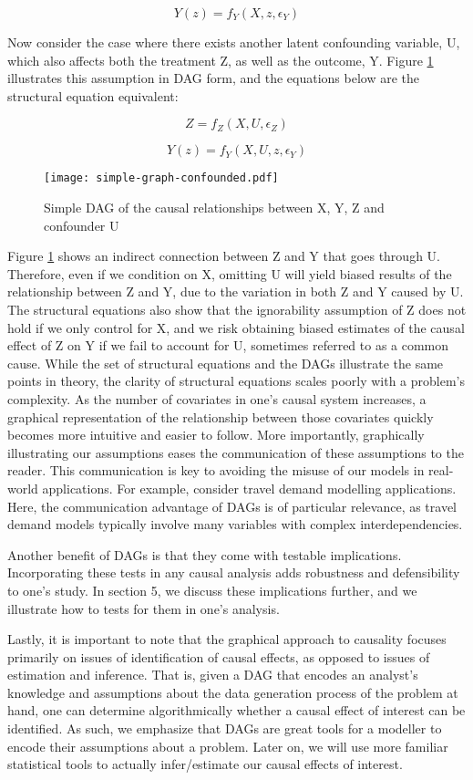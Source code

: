 \[Y(z) = f_Y(X, z, \epsilon_Y)  \]

Now consider the case where there exists another latent confounding variable, U, which also affects both the treatment Z, as well as the outcome, Y.
Figure \ref{fig:simple-graph-confounded} illustrates this assumption in DAG form, and the equations below are the structural equation equivalent:

\[Z = f_Z(X, U, \epsilon_Z)  \]

\[Y(z) = f_Y(X, U, z, \epsilon_Y)  \]

\begin{figure}[h!]
   \centering
   \texttt{[image: simple-graph-confounded.pdf]}
   \caption{Simple DAG of the causal relationships between X, Y, Z and confounder U}
   \label{fig:simple-graph-confounded}
\end{figure}

Figure \ref{fig:simple-graph-confounded} shows an indirect connection between Z and Y that goes through U.
Therefore, even if we condition on X, omitting U will yield biased results of the relationship between Z and Y, due to the variation in both Z and Y caused by U.
The structural equations also show that the ignorability assumption of Z does not hold if we only control for X, and we risk obtaining biased estimates of the causal effect of Z on Y if we fail to account for U, sometimes referred to as a common cause.
While the set of structural equations and the DAGs illustrate the same points in theory, the clarity of structural equations scales poorly with a problem's complexity.
As the number of covariates in one's causal system increases, a graphical representation of the relationship between those covariates quickly becomes more intuitive and easier to follow.
More importantly, graphically illustrating our assumptions eases the communication of these assumptions to the reader.
This communication is key to avoiding the misuse of our models in real-world applications.
For example, consider travel demand modelling applications.
Here, the communication advantage of DAGs is of particular relevance, as travel demand models typically involve many variables with complex interdependencies.

Another benefit of DAGs is that they come with testable implications.
Incorporating these tests in any causal analysis adds robustness and defensibility to one's study.
In section 5, we discuss these implications further, and we illustrate how to tests for them in one's analysis.

Lastly, it is important to note that the graphical approach to causality focuses
primarily on issues of identification of causal effects, as opposed to issues of estimation and inference. That is, given a
DAG that encodes an analyst's knowledge and assumptions about the data generation process of the problem at hand, one can determine algorithmically whether a causal effect of interest can be identified.
As such, we emphasize that DAGs are great tools
for a modeller to encode their assumptions about a problem.
Later on, we will use more familiar statistical tools to actually infer/estimate our causal effects of interest.

